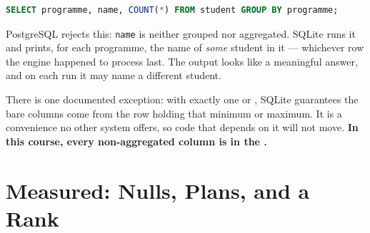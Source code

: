 \begin{alertbox}
\begin{lstlisting}[language=sql]
SELECT programme, name, COUNT(*) FROM student GROUP BY programme;
\end{lstlisting}

PostgreSQL rejects this: \texttt{name} is neither grouped nor aggregated.
SQLite runs it and prints, for each programme, the name of \emph{some} student
in it --- whichever row the engine happened to process last. The output looks
like a meaningful answer, and on each run it may name a different student.

\smallskip
There is one documented exception: with exactly one  or
, SQLite guarantees the bare columns come from the row holding that
minimum or maximum. It is a convenience no other system offers, so code that
depends on it will not move. \textbf{In this course, every non-aggregated
column is in the .}
\end{alertbox}

\section{Measured: Nulls, Plans, and a Rank}

